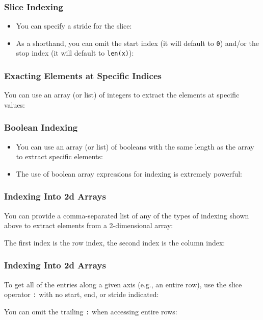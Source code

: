 \documentclass[xcolor={x11names,table}]{beamer}
\begin{document}
\begin{frame}
	\frametitle{Slice Indexing}
	
	\begin{itemize}
		\item You can specify a stride for the slice:
		
		\item As a shorthand, you can omit the start index (it will default to \texttt{0}) and/or the stop index (it will default to \texttt{len(x)}):
		
	\end{itemize}
\end{frame}

\begin{frame}
	\frametitle{Exacting Elements at Specific Indices}
	
	You can use an array (or list) of integers to extract the elements at specific values:
	
\end{frame}

\begin{frame}
	\frametitle{Boolean Indexing}
	
	\begin{itemize}
		\item You can use an array (or list) of booleans with the same length as the array to extract specific elements:
		
		\item The use of boolean array expressions for indexing is extremely powerful:
		
	\end{itemize}
\end{frame}

\begin{frame}
	\frametitle{Indexing Into 2d Arrays}
	You can provide a comma-separated list of any of the types of indexing shown above to extract elements from a 2-dimensional array:
	
	The first index is the row index, the second index is the column index:
	
\end{frame}

\begin{frame}
	\frametitle{Indexing Into 2d Arrays}
	
	To get all of the entries along a given axis (e.g., an entire row), use the slice operator \texttt{:} with no start, end, or stride indicated:
	
	You can omit the trailing \texttt{:} when accessing entire rows:
	
\end{frame}
\end{document}
